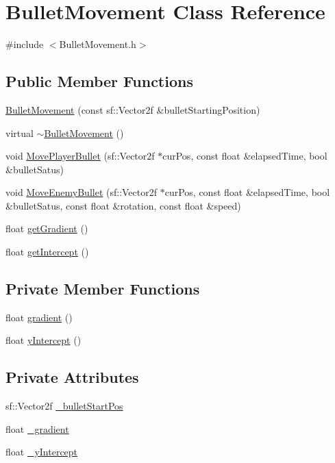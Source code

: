 \hypertarget{class_bullet_movement}{}\section{Bullet\+Movement Class Reference}
\label{class_bullet_movement}


{\ttfamily \#include $<$Bullet\+Movement.\+h$>$}

\subsection*{Public Member Functions}
\begin{DoxyCompactItemize}
\item 
\hyperlink{class_bullet_movement_a828d99972323657caf3dafa00e3a9e5e}{Bullet\+Movement} (const sf\+::\+Vector2f \&bullet\+Starting\+Position)
\item 
virtual \hyperlink{class_bullet_movement_a81e3816f8089dd796ed1ac03a3d9c683}{$\sim$\+Bullet\+Movement} ()
\item 
void \hyperlink{class_bullet_movement_a33b6ad498331352d366e2dab6bc2c712}{Move\+Player\+Bullet} (sf\+::\+Vector2f $\ast$cur\+Pos, const float \&elapsed\+Time, bool \&bullet\+Satus)
\item 
void \hyperlink{class_bullet_movement_ae7109a6098374d23e8dc2360d6546b7c}{Move\+Enemy\+Bullet} (sf\+::\+Vector2f $\ast$cur\+Pos, const float \&elapsed\+Time, bool \&bullet\+Satus, const float \&rotation, const float \&speed)
\item 
float \hyperlink{class_bullet_movement_a4dddd135a0d89dbb8d7b4ec076264f16}{get\+Gradient} ()
\item 
float \hyperlink{class_bullet_movement_ab9716be6fffd1b7f58e5b3be24062e5b}{get\+Intercept} ()
\end{DoxyCompactItemize}
\subsection*{Private Member Functions}
\begin{DoxyCompactItemize}
\item 
float \hyperlink{class_bullet_movement_a84efe87d137c1d0b9e14de5a5c9c7938}{gradient} ()
\item 
float \hyperlink{class_bullet_movement_a165576c782ea8432c14ee86456ff97c4}{y\+Intercept} ()
\end{DoxyCompactItemize}
\subsection*{Private Attributes}
\begin{DoxyCompactItemize}
\item 
sf\+::\+Vector2f \hyperlink{class_bullet_movement_a80f3b6b7f248b1bfecc4845319bc91fc}{\+\_\+bullet\+Start\+Pos}
\item 
float \hyperlink{class_bullet_movement_a21abb8a9b6d5d1d6cd5e079648ade529}{\+\_\+gradient}
\item 
float \hyperlink{class_bullet_movement_a8d20043e5da44b2585b78e0be9d9ad66}{\+\_\+y\+Intercept}
\end{DoxyCompactItemize}


